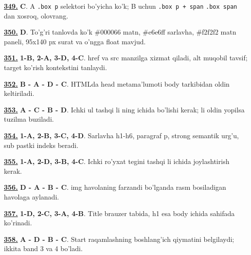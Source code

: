\documentclass[10pt,a4paper,oneside]{article}
\begin{document}
\par\vspace{3mm}
\noindent\hyperlink{q349}{\textbf{349.}} \textbf{C}.  A \texttt{.box p} selektori bo'yicha ko'k; B uchun \texttt{.box p + span} \texttt{.box span} dan xosroq, olovrang.
\par\vspace{3mm}
\noindent\hyperlink{q350}{\textbf{350.}} \textbf{D}.  To'g'ri tanlovda ko'k \#000066 matn, \#e6e6ff sarlavha, \#f2f2f2 matn paneli, 95x140 px surat va o'ngga float mavjud.
\par\vspace{3mm}
\noindent\hyperlink{q351}{\textbf{351.}} \textbf{1-B, 2-A, 3-D, 4-C}.  href va src manzilga xizmat qiladi, alt muqobil tavsif; target ko'rish kontekstini tanlaydi.
\par\vspace{3mm}
\noindent\hyperlink{q352}{\textbf{352.}} \textbf{B - A - D - C}.  HTMLda head metama'lumoti body tarkibidan oldin keltiriladi.
\par\vspace{3mm}
\noindent\hyperlink{q353}{\textbf{353.}} \textbf{A - C - B - D}.  Ichki ul tashqi li ning ichida bo'lishi kerak; li oldin yopilsa tuzilma buziladi.
\par\vspace{3mm}
\noindent\hyperlink{q354}{\textbf{354.}} \textbf{1-A, 2-B, 3-C, 4-D}.  Sarlavha h1-h6, paragraf p, strong semantik urg'u, sub pastki indeks beradi.
\par\vspace{3mm}
\noindent\hyperlink{q355}{\textbf{355.}} \textbf{1-A, 2-D, 3-B, 4-C}.  Ichki ro'yxat tegini tashqi li ichida joylashtirish kerak.
\par\vspace{3mm}
\noindent\hyperlink{q356}{\textbf{356.}} \textbf{D - A - B - C}.  img havolaning farzandi bo'lganda rasm bosiladigan havolaga aylanadi.
\par\vspace{3mm}
\noindent\hyperlink{q357}{\textbf{357.}} \textbf{1-D, 2-C, 3-A, 4-B}.  Title brauzer tabida, h1 esa body ichida sahifada ko'rinadi.
\par\vspace{3mm}
\noindent\hyperlink{q358}{\textbf{358.}} \textbf{A - D - B - C}.  Start raqamlashning boshlang'ich qiymatini belgilaydi; ikkita band 3 va 4 bo'ladi.
\end{document}
